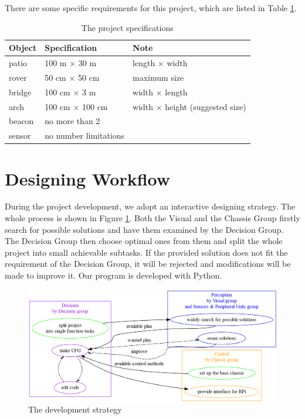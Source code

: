 There are some specific requirements for this project, which are listed in Table \ref{tab:project_specifications}.

\begin{table}[htbp]
    \centering
    \begin{tabular}{lll}
    \toprule
    \textbf{Object}  & \textbf{Specification} & \textbf{Note}                           \\
    \midrule
    patio   & 100 m  $\times$ 30 m            &  length $\times$ width                  \\
    rover   & 50 cm $\times$ 50 cm            & maximum size                            \\
    bridge  & 100 cm $\times$ 3 m             &  width $\times$ length                  \\
    arch    & 100 cm $\times$ 100 cm          &  width $\times$ height (suggested size) \\
    beacon  & no more than 2                  &                                         \\  
    sensor & no number limitations            &                                         \\
    \bottomrule
    \end{tabular}
    \caption{The project specifications}
    \label{tab:project_specifications}
\end{table}

\section{Designing Workflow}
During the project development, we adopt an interactive designing strategy. The whole process is shown in Figure \ref{fig:development strategy}. Both the Visual and the Chassis Group firstly search for possible solutions and have them examined by the Decision Group. The Decision Group then choose optimal ones from them and split the whole project into small achievable subtasks. If the provided solution does not fit the requirement of the Decision Group, it will be rejected and modifications will be made to improve it. Our program is developed with Python.

\begin{figure}[htbp]
    \centering
    \includegraphics[width=12cm]{overview/img_overview/development_strategy.png}
    \caption{The development strategy}
    \label{fig:development strategy}
\end{figure}

